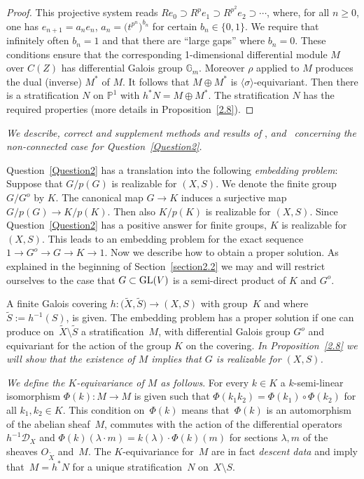 \documentclass[10pt,a4paper]{amsart}
\numberwithin{equation}{section}
\begin{document}
\begin{proof}
 This projective system reads $Re_0\supset R^pe_1\supset R^{p^2}e_2\supset \cdots$,
 where, for all $n\geq 0$, one has $e_{n+1}=a_ne_n$, $a_n= \big(t^{p^n}\big)^{b_n}$ for certain $b_n\in \{0,1\}$. We require
 that infinitely often $b_n=1$ and that there are ``large gaps'' where $b_n=0$. These conditions ensure that
 the corresponding 1-dimensional differential module $M$ over $C(Z)$ has differential Galois group $\mathbb{G}_m$.
 Moreover $\rho$ applied to $M$ produces the dual (inverse) $M^*$ of $M$. It follows that
 $M\oplus M^*$ is $\langle \sigma \rangle$-equivariant. Then there is a stratification $N$
 on $\mathbb{P}^1$ with $h^*N=M\oplus M^*$. The stratification $N$ has the required
 properties (more details in Proposition~\ref{2.8}).
 \end{proof}

{\it We describe, correct and supplement methods and results of} \cite[Section~8]{Ma-vdP2}, \cite[Section~8]{Ma} {\it and}~\cite{Er} {\it concerning the non-connected case for Question~{\rm \ref{Question2}}.}

Question~\ref{Question2} has a translation into the following {\it embedding problem}: Suppose that $G/p(G)$ is realizable for $(X,S)$. We denote the finite group $G/G^o$ by $K$. The canonical map $G\rightarrow K$ induces a surjective map $G/p(G)\rightarrow K/p(K)$. Then also $K/p(K)$ is realizable for $(X,S)$. Since Question~\ref{Question2} has a positive answer for finite groups, $K$ is realizable for $(X,S)$. This leads to an embedding problem for the exact sequence $1\rightarrow G^o\rightarrow G\rightarrow K\rightarrow 1$. Now we describe how to obtain a proper solution. As explained in the beginning of Section~\ref{section2.2} we may and will restrict ourselves to the case that $G\subset {\rm GL}(V)$ is a semi-direct product of $K$ and $G^o$.

A finite Galois covering $h\colon \big(\tilde{X},\tilde{S}\big)\rightarrow (X,S)$ with group~$K$ and where $\tilde{S}:=h^{-1}(S)$, is given. The embedding problem has a proper solution if one can produce on~$\tilde{X}\setminus \tilde{S}$ a stratification~$M$, with differential Galois group $G^o$ and equivariant for the action of the group $K$ on the covering. {\it In Proposition~{\rm \ref{2.8}} we will show that the existence of $M$ implies that $G$ is realizable for $(X,S)$.}

{\it We define the $K$-equivariance of $M$ as follows}. For every $k\in K$ a $k$-semi-linear isomorphism $\Phi (k)\colon M\rightarrow M$ is given such that
$\Phi (k_1k_2)= \Phi(k_1)\circ \Phi(k_2)$ for all $k_1,k_2\in K$. This condition on~$\Phi (k)$ means that~$\Phi(k)$ is an automorphism of the abelian sheaf~$M$, commutes with the action of the differential operators $h^{-1}\mathcal{D}_{X}$ and $\Phi (k)(\lambda \cdot m)= k(\lambda) \cdot \Phi(k)(m)$ for sections $\lambda, m$ of the sheaves $O_{\tilde{X}}$ and~$M$. The $K$-equivariance for~$M$ are in fact {\it descent data} and imply that~$M=h^*N$ for a unique stratification~$N$ on~$X\setminus S$.
\end{document}
